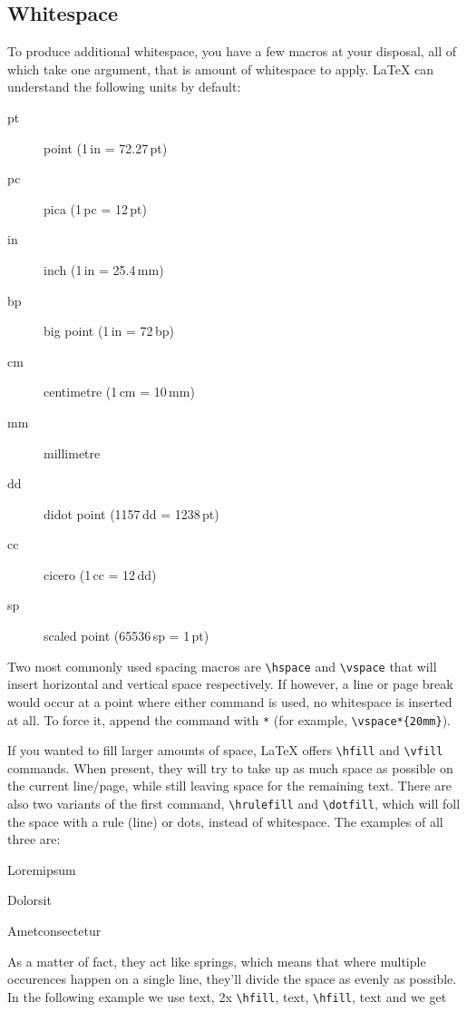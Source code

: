 \subsection{Whitespace}

To produce additional whitespace, you have a few macros at your disposal, all of which take one argument, that is amount of whitespace to apply. LaTeX can understand the following units by default:

\begin{description}
  \item[pt]  point         (1\,in = 72.27\,pt)
  \item[pc]  pica          (1\,pc = 12\,pt)
  \item[in]  inch          (1\,in = 25.4\,mm)
  \item[bp]  big point     (1\,in = 72\,bp)
  \item[cm]  centimetre    (1\,cm = 10\,mm)
  \item[mm]  millimetre
  \item[dd]  didot point   (1157\,dd = 1238\,pt)
  \item[cc]  cicero        (1\,cc = 12\,dd)
  \item[sp]  scaled point  (65536\,sp = 1\,pt)
\end{description}

Two most commonly used spacing macros are \verb|\hspace| and \verb|\vspace| that will insert horizontal and vertical space respectively. If however, a line or page break would occur at a point where either command is used, no whitespace is inserted at all. To force it, append the command with \verb|*| (for example, \verb|\vspace*{20mm}|).

If you wanted to fill larger amounts of space, LaTeX offers \verb|\hfill| and \verb|\vfill| commands. When present, they will try to take up as much space as possible on the current line/page, while still leaving space for the remaining text. There are also two variants of the first command, \verb|\hrulefill| and \verb|\dotfill|, which will foll the space with a rule (line) or dots, instead of whitespace. The examples of all three are:

Lorem\hfill ipsum

Dolor\hrulefill sit

Amet\dotfill consectetur

As a matter of fact, they act like springs, which means that where multiple occurences happen on a single line, they'll divide the space as evenly as possible. In the following example we use text, 2x \verb|\hfill|, text, \verb|\hfill|, text and we get

